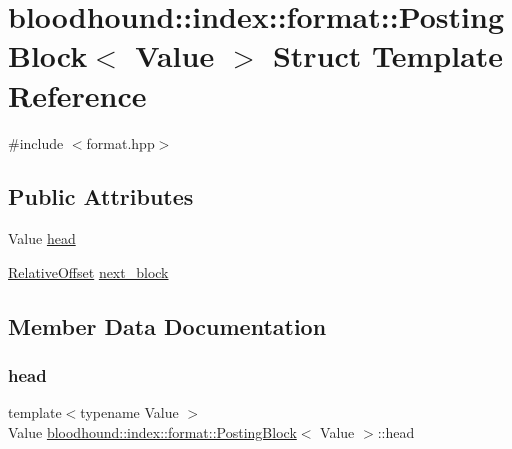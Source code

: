 \hypertarget{structbloodhound_1_1index_1_1format_1_1PostingBlock}{}\section{bloodhound\+:\+:index\+:\+:format\+:\+:Posting\+Block$<$ Value $>$ Struct Template Reference}
\label{structbloodhound_1_1index_1_1format_1_1PostingBlock}


{\ttfamily \#include $<$format.\+hpp$>$}

\subsection*{Public Attributes}
\begin{DoxyCompactItemize}
\item 
Value \hyperlink{structbloodhound_1_1index_1_1format_1_1PostingBlock_a0820d9474f2563bf913457e3b8681370}{head}
\item 
\hyperlink{structbloodhound_1_1RelativeOffset}{Relative\+Offset} \hyperlink{structbloodhound_1_1index_1_1format_1_1PostingBlock_ad7e7da1b1f4ed16a0b51ba9c8fbac401}{next\+\_\+block}
\end{DoxyCompactItemize}


\subsection{Member Data Documentation}
\mbox{\label{structbloodhound_1_1index_1_1format_1_1PostingBlock_a0820d9474f2563bf913457e3b8681370}} 
\subsubsection{\texorpdfstring{head}{head}}
{\footnotesize\ttfamily template$<$typename Value $>$ \\
Value \hyperlink{structbloodhound_1_1index_1_1format_1_1PostingBlock}{bloodhound\+::index\+::format\+::\+Posting\+Block}$<$ Value $>$\+::head}

\mbox{\label{structbloodhound_1_1index_1_1format_1_1PostingBlock_ad7e7da1b1f4ed16a0b51ba9c8fbac401}} 
